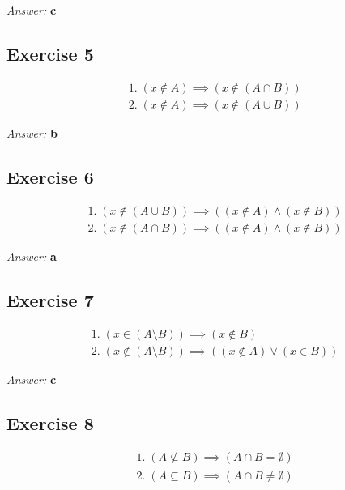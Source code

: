 \documentclass[11pt]{article}
\begin{document}
\emph{Answer:} \textbf{c}
\subsection{Exercise 5}
\label{sec-2-5}
\begin{equation}
\begin{split}
& 1.\; (x \not \in A) \implies (x \not \in (A \cap B)) \\
& 2.\; (x \not \in A) \implies (x \not \in (A \cup B))
\end{split}
\end{equation}

\emph{Answer:} \textbf{b}
\subsection{Exercise 6}
\label{sec-2-6}
\begin{equation}
\begin{split}
& 1.\; (x \not \in (A \cup B)) \implies ((x \not \in A) \land (x \not \in B)) \\
& 2.\; (x \not \in (A \cap B)) \implies ((x \not \in A) \land (x \not \in B))
\end{split}
\end{equation}

\emph{Answer:} \textbf{a}
\subsection{Exercise 7}
\label{sec-2-7}
\begin{equation}
\begin{split}
& 1.\; (x \in (A \setminus B)) \implies (x \not \in B) \\
& 2.\; (x \not \in (A \setminus B)) \implies ((x \not \in A) \lor (x \in B))
\end{split}
\end{equation}

\emph{Answer:} \textbf{c}
\subsection{Exercise 8}
\label{sec-2-8}
\begin{equation}
\begin{split}
& 1.\; (A \not \subseteq B) \implies (A \cap B = \emptyset) \\
& 2.\; (A \subseteq B) \implies (A \cap B \neq \emptyset)
\end{split}
\end{equation}
\end{document}

